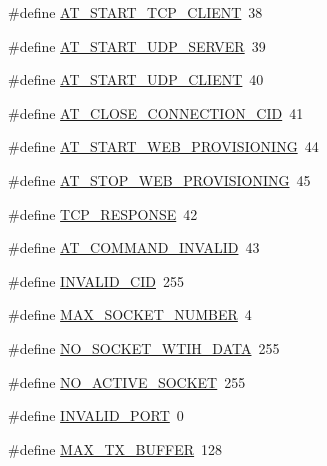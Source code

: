 \begin{DoxyCompactItemize}
\#define \hyperlink{group__wireless__interface_ga647223879f11c1980a9ff63907b0c815}{A\+T\+\_\+\+S\+T\+A\+R\+T\+\_\+\+T\+C\+P\+\_\+\+C\+L\+I\+E\+NT}~38
\item 
\#define \hyperlink{group__wireless__interface_ga568aa2eb6e8c8bec43053eae911393bc}{A\+T\+\_\+\+S\+T\+A\+R\+T\+\_\+\+U\+D\+P\+\_\+\+S\+E\+R\+V\+ER}~39
\item 
\#define \hyperlink{group__wireless__interface_ga8d28542a331e37312330c1eb2332c18e}{A\+T\+\_\+\+S\+T\+A\+R\+T\+\_\+\+U\+D\+P\+\_\+\+C\+L\+I\+E\+NT}~40
\item 
\#define \hyperlink{group__wireless__interface_ga4367e6e3d4bb9a810da8becb40b1d2eb}{A\+T\+\_\+\+C\+L\+O\+S\+E\+\_\+\+C\+O\+N\+N\+E\+C\+T\+I\+O\+N\+\_\+\+C\+ID}~41
\item 
\#define \hyperlink{group__wireless__interface_ga4a5dc9f7858ddf31b346ad8265d8c8c9}{A\+T\+\_\+\+S\+T\+A\+R\+T\+\_\+\+W\+E\+B\+\_\+\+P\+R\+O\+V\+I\+S\+I\+O\+N\+I\+NG}~44
\item 
\#define \hyperlink{group__wireless__interface_gad2930cc09dd751f6963bef356511ac1a}{A\+T\+\_\+\+S\+T\+O\+P\+\_\+\+W\+E\+B\+\_\+\+P\+R\+O\+V\+I\+S\+I\+O\+N\+I\+NG}~45
\item 
\#define \hyperlink{group__wireless__interface_ga26775cbb82cb880b7ddd90a24ed1a589}{T\+C\+P\+\_\+\+R\+E\+S\+P\+O\+N\+SE}~42
\item 
\#define \hyperlink{group__wireless__interface_gaadad4ba37ed52982223e653aac350ff0}{A\+T\+\_\+\+C\+O\+M\+M\+A\+N\+D\+\_\+\+I\+N\+V\+A\+L\+ID}~43
\item 
\#define \hyperlink{group__wireless__interface_gac546f6531236587a348593a1ff64cfb6}{I\+N\+V\+A\+L\+I\+D\+\_\+\+C\+ID}~255
\item 
\#define \hyperlink{group__wireless__interface_ga319728830490f2d454bf2a76a906f55f}{M\+A\+X\+\_\+\+S\+O\+C\+K\+E\+T\+\_\+\+N\+U\+M\+B\+ER}~4
\item 
\#define \hyperlink{group__wireless__interface_ga2c931d16d52f4c5aa6930d1adc740a0a}{N\+O\+\_\+\+S\+O\+C\+K\+E\+T\+\_\+\+W\+T\+I\+H\+\_\+\+D\+A\+TA}~255
\item 
\#define \hyperlink{group__wireless__interface_ga4295a002f81500d62db9e6aab5c525af}{N\+O\+\_\+\+A\+C\+T\+I\+V\+E\+\_\+\+S\+O\+C\+K\+ET}~255
\item 
\#define \hyperlink{group__wireless__interface_ga6f07d0094e837d61131ab0b3aa8ab1fc}{I\+N\+V\+A\+L\+I\+D\+\_\+\+P\+O\+RT}~0
\item 
\#define \hyperlink{group__wireless__interface_ga3fe2eeb632fd261c95c405b9e9852369}{M\+A\+X\+\_\+\+T\+X\+\_\+\+B\+U\+F\+F\+ER}~128

\end{DoxyCompactItemize}
